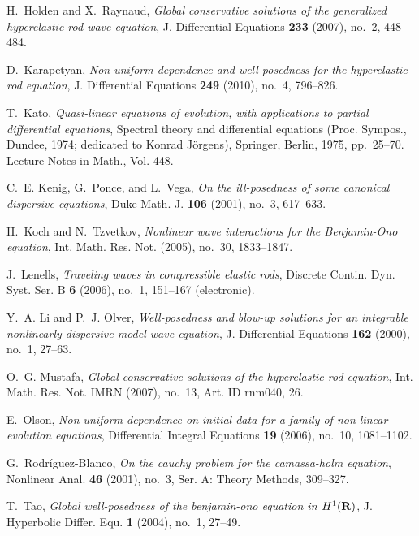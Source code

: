\documentclass[final,noinfo]{thesis}
\begin{document}
\begin{thebibliography}{100}
H.~Holden and X.~Raynaud, \emph{Global conservative solutions of the
  generalized hyperelastic-rod wave equation}, J. Differential Equations
  \textbf{233} (2007), no.~2, 448--484.

D.~Karapetyan, \emph{Non-uniform dependence and well-posedness for the
  hyperelastic rod equation}, J. Differential Equations \textbf{249} (2010),
  no.~4, 796--826.

T.~Kato, \emph{Quasi-linear equations of evolution, with applications to
  partial differential equations}, Spectral theory and differential equations
  ({P}roc. {S}ympos., {D}undee, 1974; dedicated to {K}onrad {J}{\"o}rgens),
  Springer, Berlin, 1975, pp.~25--70. Lecture Notes in Math., Vol. 448.
  

C.~E. Kenig, G.~Ponce, and L.~Vega, \emph{On the ill-posedness of some
  canonical dispersive equations}, Duke Math. J. \textbf{106} (2001), no.~3,
  617--633.

H.~Koch and N.~Tzvetkov, \emph{Nonlinear wave interactions for the
  {B}enjamin-{O}no equation}, Int. Math. Res. Not. (2005), no.~30, 1833--1847.
  

J.~Lenells, \emph{Traveling waves in compressible elastic rods}, Discrete
  Contin. Dyn. Syst. Ser. B \textbf{6} (2006), no.~1, 151--167 (electronic).

Y.~A. Li and P.~J. Olver, \emph{Well-posedness and blow-up solutions for an
  integrable nonlinearly dispersive model wave equation}, J. Differential
  Equations \textbf{162} (2000), no.~1, 27--63.

O.~G. Mustafa, \emph{Global conservative solutions of the hyperelastic rod
  equation}, Int. Math. Res. Not. IMRN (2007), no.~13, Art. ID rnm040, 26.
  

E.~Olson, \emph{Non-uniform dependence on initial data for a family of
  non-linear evolution equations}, Differential Integral Equations \textbf{19}
  (2006), no.~10, 1081--1102.

G.~Rodr\'iguez-Blanco, \emph{On the cauchy problem for the camassa-holm
  equation}, Nonlinear Anal. \textbf{46} (2001), no.~3, Ser. A: Theory Methods,
  309--327.

T.~Tao, \emph{Global well-posedness of the benjamin-ono equation in $H^1(\bf
  R)$}, J. Hyperbolic Differ. Equ. \textbf{1} (2004), no.~1, 27--49.


\end{thebibliography}
\end{document}
